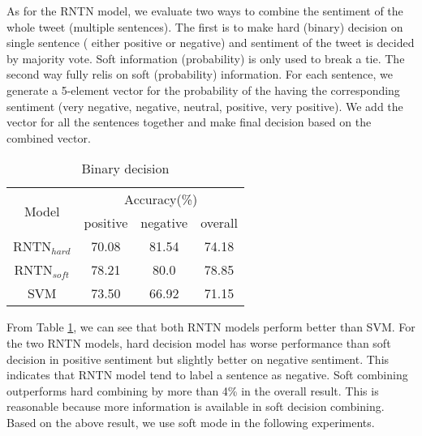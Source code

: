 As for the RNTN model, we evaluate two ways to combine the sentiment of the whole tweet (multiple sentences). The first is to make hard (binary) decision on single sentence ( either positive or negative) and sentiment of the tweet is decided by majority vote. Soft information (probability) is only used to break a tie. The second way fully relis on soft (probability) information. For each sentence, we generate a 5-element vector for the probability of the having the corresponding sentiment (very negative, negative, neutral, positive, very positive). We add the vector for all the sentences together and make final decision based on the combined vector. 
\begin{table}[H]
  \begin{center}
    \begin{tabular}{cccc}\hline
      \multirow{2}{*}{Model} 
      & \multicolumn{3}{c}{Accuracy(\%)} \\\cline{2-4}
    & positive & negative & overall \\ \hline
    RNTN$_{hard}$  & 70.08 	    &  81.54       &  74.18     \\
    RNTN$_{soft}$  & 78.21     &   80.0	    &   78.85    \\ 
    SVM           & 73.50     &   66.92     &   71.15      \\\hline 
    \end{tabular}
    \end{center}
    \caption{\label{exp2_1} Binary decision}
\end{table}

From Table \ref{exp2_1}, we can see that both RNTN models perform better than SVM. For the two RNTN models, 
 hard decision model has worse performance than soft decision in positive sentiment but slightly better on negative sentiment. This indicates that RNTN model tend to label a sentence as negative. Soft combining outperforms hard combining by more than 4\% in the overall result. This is reasonable because more information is available in soft decision combining. Based on the above result, we use soft mode in the following experiments. 

